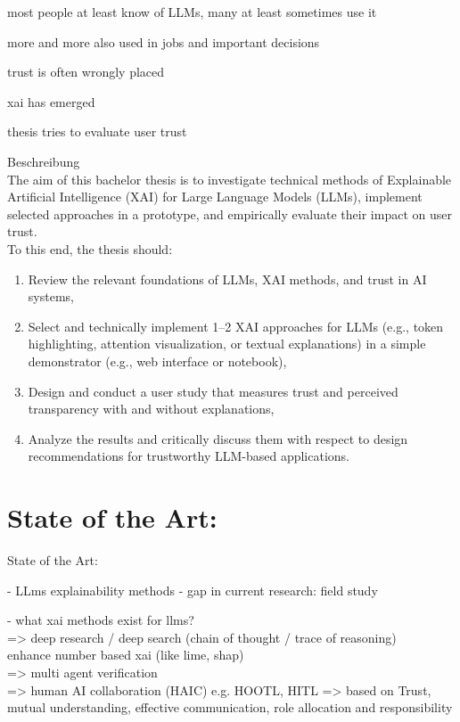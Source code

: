 

most people at least know of LLMs, many at least sometimes use it
\cite{bern_chance_nodate}

more and more also used in jobs and important decisions

trust is often wrongly placed 

xai has emerged

thesis tries to evaluate user trust


Beschreibung\\
The aim of this bachelor thesis is to investigate technical methods of Explainable Artificial Intelligence (XAI) for Large Language Models (LLMs), implement selected approaches in a prototype, and empirically evaluate their impact on user trust.\\
To this end, the thesis should:\\
\begin{enumerate}
    \item Review the relevant foundations of LLMs, XAI methods, and trust in AI systems,
    \item Select and technically implement 1–2 XAI approaches for LLMs (e.g., token highlighting, attention visualization, or textual explanations) in a simple demonstrator (e.g., web interface or notebook),
    \item Design and conduct a user study that measures trust and perceived transparency with and without explanations,
    \item Analyze the results and critically discuss them with respect to design recommendations for trustworthy LLM-based applications.
\end{enumerate}









\section{State of the Art: }
State of the Art: 

- LLms explainability methods
- gap in current research: field study


- what xai methods exist for llms?\\

=> deep research / deep search (chain of thought / trace of reasoning)\\
enhance number based xai (like lime, shap)\\
=> multi agent verification\\
=> human AI collaboration (HAIC) e.g. HOOTL, HITL => based on Trust, mutual understanding, effective communication, role allocation and responsibility \cite{jeong_design_nodate}\\

